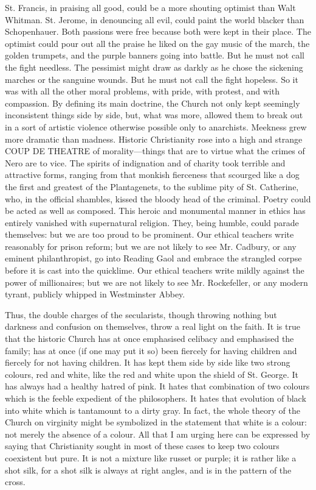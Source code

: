 St. Francis, in praising all good, could be a more shouting optimist than Walt Whitman. St. Jerome, in denouncing all evil, could paint the world blacker than Schopenhauer. Both passions were free because both were kept in their place. The optimist could pour out all the praise he liked on the gay music of the march, the golden trumpets, and the purple banners going into battle. But he must not call the fight needless. The pessimist might draw as darkly as he chose the sickening marches or the sanguine wounds. But he must not call the fight hopeless. So it was with all the other moral problems, with pride, with protest, and with compassion. By defining its main doctrine, the Church not only kept seemingly inconsistent things side by side, but, what was more, allowed them to break out in a sort of artistic violence otherwise possible only to anarchists. Meekness grew more dramatic than madness. Historic Christianity rose into a high and strange COUP DE THEATRE of morality—things that are to virtue what the crimes of Nero are to vice. The spirits of indignation and of charity took terrible and attractive forms, ranging from that monkish fierceness that scourged like a dog the first and greatest of the Plantagenets, to the sublime pity of St. Catherine, who, in the official shambles, kissed the bloody head of the criminal. Poetry could be acted as well as composed. This heroic and monumental manner in ethics has entirely vanished with supernatural religion. They, being humble, could parade themselves: but we are too proud to be prominent. Our ethical teachers write reasonably for prison reform; but we are not likely to see Mr. Cadbury, or any eminent philanthropist, go into Reading Gaol and embrace the strangled corpse before it is cast into the quicklime. Our ethical teachers write mildly against the power of millionaires; but we are not likely to see Mr. Rockefeller, or any modern tyrant, publicly whipped in Westminster Abbey.

Thus, the double charges of the secularists, though throwing nothing but darkness and confusion on themselves, throw a real light on the faith. It is true that the historic Church has at once emphasised celibacy and emphasised the family; has at once (if one may put it so) been fiercely for having children and fiercely for not having children. It has kept them side by side like two strong colours, red and white, like the red and white upon the shield of St. George. It has always had a healthy hatred of pink. It hates that combination of two colours which is the feeble expedient of the philosophers. It hates that evolution of black into white which is tantamount to a dirty gray. In fact, the whole theory of the Church on virginity might be symbolized in the statement that white is a colour: not merely the absence of a colour. All that I am urging here can be expressed by saying that Christianity sought in most of these cases to keep two colours coexistent but pure. It is not a mixture like russet or purple; it is rather like a shot silk, for a shot silk is always at right angles, and is in the pattern of the cross.

